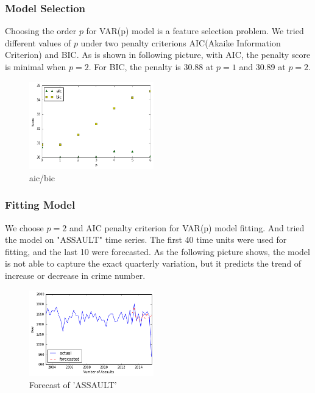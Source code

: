 \documentclass[11pt,conference]{IEEEtran}
\begin{document}
\subsubsection{Model Selection}
Choosing the order $p$ for VAR(p) model is a feature selection problem. We tried different values of $p$ under two penalty criterions AIC(Akaike Information Criterion) and BIC. As is shown in following picture, with AIC, the penalty score is minimal when $p=2$. For BIC, the penalty is 30.88 at $p=1$ and 30.89 at $p=2$.
\begin{figure}%
\begin{center}
\includegraphics [width=0.48\textwidth]{pics/aic_bic.png}
\caption{aic/bic}
\end{center}
\end{figure}

\subsubsection{Fitting Model}
We choose $p=2$ and AIC penalty criterion for VAR(p) model fitting. And tried the model on "ASSAULT" time series. The first 40 time units were used for fitting, and the last 10 were forecasted. As the following picture shows, the model is not able to capture the exact quarterly variation, but it predicts the trend of increase or decrease in crime number.
\begin{figure}%
\begin{center}
\includegraphics [width=0.48\textwidth]{pics/assault_forecast.png}
\caption{Forecast of 'ASSAULT'}
\end{center}
\end{figure}
\end{document}
